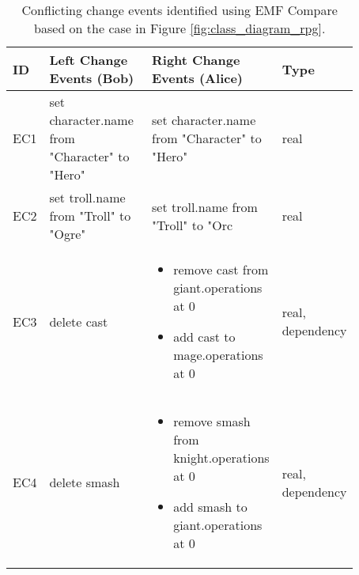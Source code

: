 \begin{table*}[ht]
\centering
  \caption{Conflicting change events identified using EMF Compare based on the case in Figure \ref{fig:class_diagram_rpg}.}
\label{table:emfc_conflicts}
\begin{scriptsize}
  \begin{tabular}{|p{0.04\linewidth}|p{0.36\linewidth}|p{0.36\linewidth}|
      p{0.11\linewidth}|}
    \hline
    \textbf{ID} & 
    \textbf{Left Change Events (Bob)} & 
    \textbf{Right Change Events (Alice)} & 
    \textbf{Type}\\ 
    \hline
    EC1 & 
    set character.name from "Character" to "Hero" & 
    set character.name from "Character" to "Hero" & 
    real \\
    \hline
    EC2 & set troll.name from "Troll" to "Ogre" & 
    set troll.name from "Troll" to "Orc & 
    real \\ 
    \hline
    EC3 & 
    delete cast
    & 
    \begin{minipage}[t]{\linewidth}
      \raggedright
      \begin{itemize}[leftmargin=0pt]
        \setlength
        \item[] remove cast from giant.operations at 0
        \item[] add cast to mage.operations at 0
      \end{itemize}
    \end{minipage}
    & 
    real, dependency\\
    \hline
    EC4 & 
    delete smash
     & 
    \begin{minipage}[t]{\linewidth}
      \raggedright
      \begin{itemize}[leftmargin=0pt]
        \setlength
        \item[] remove smash from knight.operations at 0
        \item[] add smash to giant.operations at 0
      \end{itemize}
    \end{minipage}
    & 
    real, dependency\\
    \hline
  \end{tabular}
\end{scriptsize}
\end{table*}


